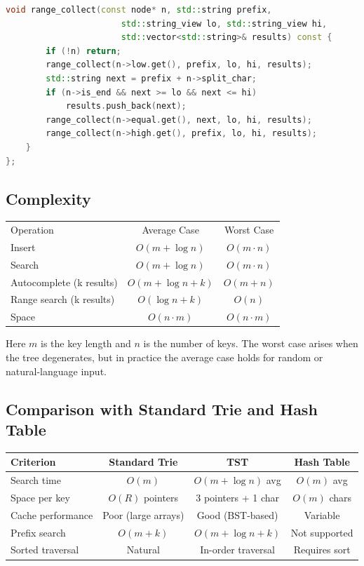 \begin{lstlisting}[language=C++]
    void range_collect(const node* n, std::string prefix,
                       std::string_view lo, std::string_view hi,
                       std::vector<std::string>& results) const {
        if (!n) return;
        range_collect(n->low.get(), prefix, lo, hi, results);
        std::string next = prefix + n->split_char;
        if (n->is_end && next >= lo && next <= hi)
            results.push_back(next);
        range_collect(n->equal.get(), next, lo, hi, results);
        range_collect(n->high.get(), prefix, lo, hi, results);
    }
};
\end{lstlisting}

\subsection{Complexity}

\begin{center}
\begin{tabular}{lcc}
\toprule
Operation & Average Case & Worst Case \\
Insert & $O(m + \log n)$ & $O(m \cdot n)$ \\
Search & $O(m + \log n)$ & $O(m \cdot n)$ \\
Autocomplete (k results) & $O(m + \log n + k)$ & $O(m + n)$ \\
Range search (k results) & $O(\log n + k)$ & $O(n)$ \\
Space & $O(n \cdot m)$ & $O(n \cdot m)$ \\
\bottomrule
\end{tabular}
\end{center}

Here $m$ is the key length and $n$ is the number of keys. The worst case arises when the tree degenerates, but in practice the average case holds for random or natural-language input.

\subsection{Comparison with Standard Trie and Hash Table}

\begin{center}
\begin{tabular}{lccc}
\toprule
Criterion & Standard Trie & TST & Hash Table \\
\midrule
Search time & $O(m)$ & $O(m + \log n)$ avg & $O(m)$ avg \\
Space per key & $O(R)$ pointers & 3 pointers + 1 char & $O(m)$ chars \\
Cache performance & Poor (large arrays) & Good (BST-based) & Variable \\
Prefix search & $O(m + k)$ & $O(m + \log n + k)$ & Not supported \\
Sorted traversal & Natural & In-order traversal & Requires sort \\
\bottomrule
\end{tabular}
\end{center}

